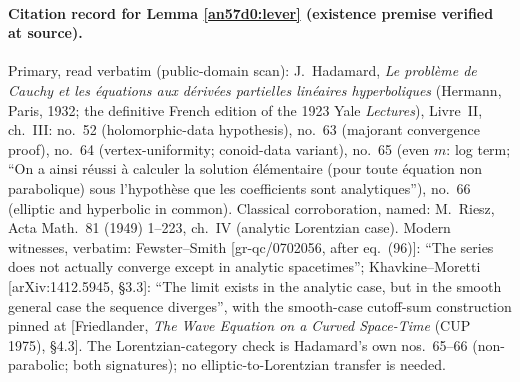 \paragraph{Citation record for Lemma \ref{an57d0:lever} (existence
premise verified at source).}
Primary, read verbatim (public-domain scan): J.~Hadamard, \emph{Le probl\`eme de Cauchy et les \'equations
aux d\'eriv\'ees partielles lin\'eaires hyperboliques} (Hermann, Paris,
1932; the definitive French edition of the 1923 Yale \emph{Lectures}),
Livre~II, ch.~III: no.~52 (holomorphic-data hypothesis), no.~63 (majorant
convergence proof), no.~64 (vertex-uniformity; conoid-data variant), no.~65
(even $m$: log term; ``On a ainsi r\'eussi \`a calculer la solution
\'el\'ementaire (pour toute \'equation non parabolique) sous l'hypoth\`ese
que les coefficients sont analytiques''), no.~66 (elliptic and hyperbolic
in common). Classical corroboration, named: M.~Riesz, Acta Math.\ 81 (1949)
1--223, ch.~IV (analytic Lorentzian case). Modern witnesses, verbatim:
Fewster--Smith [gr-qc/0702056, after eq.~(96)]: ``The series does not
actually converge except in analytic spacetimes''; Khavkine--Moretti
[arXiv:1412.5945, \S3.3]: ``The limit exists in the analytic case, but in
the smooth general case the sequence diverges'', with the smooth-case
cutoff-sum construction pinned at [Friedlander, \emph{The Wave Equation on
a Curved Space-Time} (CUP 1975), \S4.3]. The Lorentzian-category check is
Hadamard's own nos.~65--66 (non-parabolic; both signatures); no
elliptic-to-Lorentzian transfer is needed.

